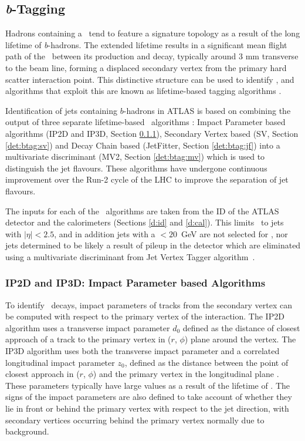 \subsection{\textit{b}-Tagging}
\label{det:btagging}

	Hadrons containing a \bquark\, tend to feature a signature topology as a result of the long lifetime of \textit{b}-hadrons. The extended lifetime results in a significant mean flight path of the \bhadron\ between its production and decay, typically around 3 mm transverse to the beam line, forming a displaced secondary vertex from the primary hard scatter interaction point. This distinctive structure can be used to identify \bjets, and algorithms that exploit this are known as lifetime-based tagging algorithms \cite{bTagPerformance}.

	Identification of jets containing $b$-hadrons in ATLAS is based on combining the output of three separate lifetime-based \btag\, algorithms \cite{bTagExpPerf}: Impact Parameter based algorithms (IP2D and IP3D, Section \ref{det:btag:ip}), Secondary Vertex based (SV, Section \ref{det:btag:sv}) and Decay Chain based (JetFitter, Section \ref{det:btag:jf}) into a multivariate discriminant (MV2, Section \ref{det:btag:mv}) which is used to distinguish the jet flavours. These algorithms have undergone continuous improvement over the Run-2 cycle of the LHC to improve the separation of jet flavours.

	The inputs for each of the \btagging\, algorithms are taken from the ID of the ATLAS detector and the calorimeters (Sections \ref{d:id} and \ref{d:cal}). This limits \btagging\, to jets with $|\eta|<2.5$, and in addition jets with a \pt$<20$~GeV are not selected for \btagging, nor jets determined to be likely a result of pileup in the detector which are eliminated using a multivariate discriminant from Jet Vertex Tagger algorithm~\cite{btagOptimisation, pileup}.

	\subsubsection{IP2D and IP3D: Impact Parameter based Algorithms}
		\label{det:btag:ip}

		To identify \bhadron\ decays, impact parameters of tracks from the secondary vertex can be computed with respect to the primary vertex of the interaction. The IP2D algorithm uses a transverse impact parameter $d_0$ defined as the distance of closest approach of a track to the  primary vertex in ($r$, $\phi$) plane around the vertex. The IP3D algorithm uses both the transverse impact parameter and a correlated longitudinal impact parameter $z_0$, defined as the distance between the point of closest approach in ($r$, $\phi$) and the primary vertex in the longitudinal plane \cite{IP3D}. These parameters typically have large values as a result of the lifetime of \bquark. The signs of the impact parameters are also defined to take account of whether they lie in front or behind the primary vertex with respect to the jet direction, with secondary vertices occurring behind the primary vertex normally due to background.

